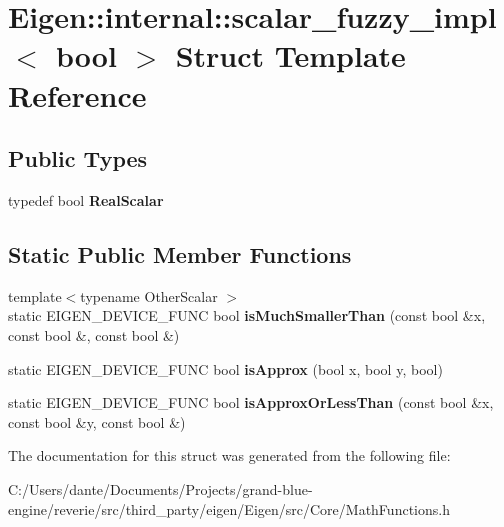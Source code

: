 \hypertarget{struct_eigen_1_1internal_1_1scalar__fuzzy__impl_3_01bool_01_4}{}\section{Eigen\+::internal\+::scalar\+\_\+fuzzy\+\_\+impl$<$ bool $>$ Struct Template Reference}
\label{struct_eigen_1_1internal_1_1scalar__fuzzy__impl_3_01bool_01_4}
\subsection*{Public Types}
\begin{DoxyCompactItemize}
\item 
\mbox{\label{struct_eigen_1_1internal_1_1scalar__fuzzy__impl_3_01bool_01_4_a847d9c0b3aa79d40355a2ebf0c26296b}} 
typedef bool {\bfseries Real\+Scalar}
\end{DoxyCompactItemize}
\subsection*{Static Public Member Functions}
\begin{DoxyCompactItemize}
\item 
\mbox{\label{struct_eigen_1_1internal_1_1scalar__fuzzy__impl_3_01bool_01_4_a42fdf2f84eccb2a67a34ded92920ddd7}} 
{\footnotesize template$<$typename Other\+Scalar $>$ }\\static E\+I\+G\+E\+N\+\_\+\+D\+E\+V\+I\+C\+E\+\_\+\+F\+U\+NC bool {\bfseries is\+Much\+Smaller\+Than} (const bool \&x, const bool \&, const bool \&)
\item 
\mbox{\label{struct_eigen_1_1internal_1_1scalar__fuzzy__impl_3_01bool_01_4_a88197479398558622a6f41dbbfe9c575}} 
static E\+I\+G\+E\+N\+\_\+\+D\+E\+V\+I\+C\+E\+\_\+\+F\+U\+NC bool {\bfseries is\+Approx} (bool x, bool y, bool)
\item 
\mbox{\label{struct_eigen_1_1internal_1_1scalar__fuzzy__impl_3_01bool_01_4_ad744416c5d6ede4e0d753479da8ac504}} 
static E\+I\+G\+E\+N\+\_\+\+D\+E\+V\+I\+C\+E\+\_\+\+F\+U\+NC bool {\bfseries is\+Approx\+Or\+Less\+Than} (const bool \&x, const bool \&y, const bool \&)
\end{DoxyCompactItemize}


The documentation for this struct was generated from the following file\+:\begin{DoxyCompactItemize}
\item 
C\+:/\+Users/dante/\+Documents/\+Projects/grand-\/blue-\/engine/reverie/src/third\+\_\+party/eigen/\+Eigen/src/\+Core/Math\+Functions.\+h\end{DoxyCompactItemize}
